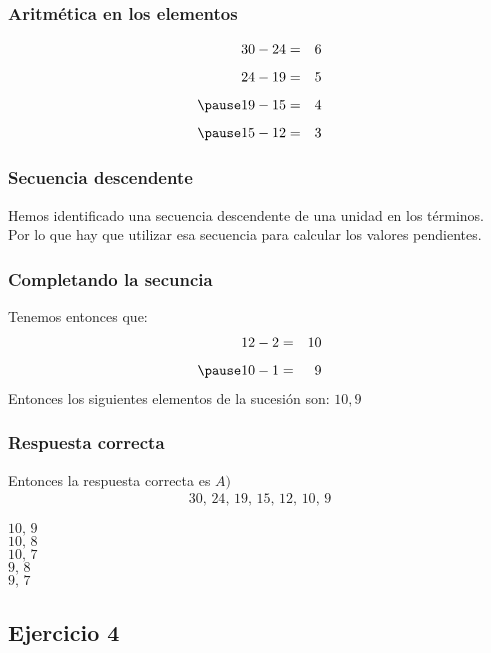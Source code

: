 \begin{frame}
\frametitle{Aritmética en los elementos}
\begin{eqnarray*}
30 - 24 &=& 6 \\[0.5em] 
24 - 19 &=& 5 \\[0.5em] \pause
19 - 15 &=& 4 \\[0.5em] \pause
15 - 12 &=& 3
\end{eqnarray*}
\end{frame}
\begin{frame}
\frametitle{Secuencia descendente}
Hemos identificado una secuencia descendente de una unidad en los términos.
\\
\bigskip
\pause
Por lo que hay que utilizar esa secuencia para calcular los valores pendientes.
\end{frame}
\begin{frame}
\frametitle{Completando la secuncia}
Tenemos entonces que:
\pause
\begin{eqnarray*}
12 - 2 &=& 10 \\[0.5em] \pause
10 - 1 &=& 9
\end{eqnarray*}
\pause
Entonces los siguientes elementos de la sucesión son: $10, 9$
\end{frame}
\begin{frame}
\frametitle{Respuesta correcta}
Entonces la respuesta correcta es $A)$
\begin{align*}
30, \, 24, \, 19, \, 15, \, 12, \, 10 , \, 9
\end{align*}
\begin{choices}
\choice $10, \, 9$ \\
\choice $10, \, 8$ \\
\choice $10, \, 7$ \\
\choice $9, \, 8$ \\
\choice $9, \, 7$ \\
\end{choices}
\end{frame}

\subsection{Ejercicio 4}

